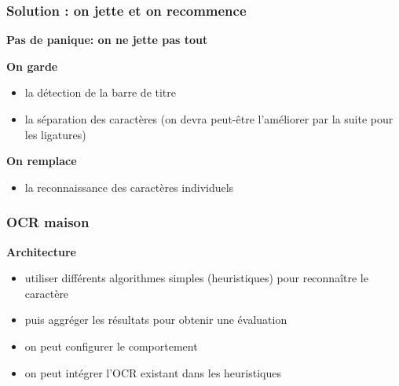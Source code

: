 \documentclass[xcolor=dvipsnames]{beamer}
\begin{document}
\begin{frame}
\frametitle{Solution : on jette et on recommence}
    \pause
    \begin{center}\begin{alertblock}{}
            \begin{center}\textbf{\Large Pas de panique: on ne jette pas tout}\end{center}\pause
    \end{alertblock}\end{center}
    \begin{center}\begin{alertblock}{}
            \begin{center}\textbf{\Large On garde}\end{center}\pause
    \end{alertblock}\end{center}
    \begin{itemize}
    \item la détection de la barre de titre\pause
    \item la séparation des caractères (on devra peut-être l'améliorer par la suite pour les ligatures)\pause
    \end{itemize}
    \begin{center}\begin{alertblock}{}
            \begin{center}\textbf{\Large On remplace}\end{center}\pause
    \end{alertblock}\end{center}
    \begin{itemize}
    \item la reconnaissance des caractères individuels
    \end{itemize}
\end{frame}


\begin{frame}
\frametitle{OCR maison}
    \begin{center}\begin{alertblock}{}
            \begin{center}
            \textbf{\Large Architecture}\pause
            \begin{itemize}
            \item utiliser différents algorithmes simples (heuristiques) pour reconnaître le caractère\pause
            \item puis aggréger les résultats pour obtenir une évaluation\pause
            \item on peut configurer le comportement\pause
            \item on peut intégrer l'OCR existant dans les heuristiques
            \end{itemize}
            \end{center}
    \end{alertblock}\end{center}
\end{frame}
\end{document}
